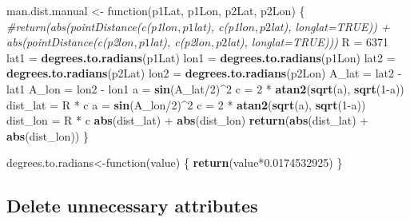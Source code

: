 \documentclass[]{article}
\newenvironment{Shaded}{\begin{snugshade}}{\end{snugshade}}
\newcommand{\KeywordTok}[1]{\textcolor[rgb]{0.13,0.29,0.53}{\textbf{{#1}}}}
\newcommand{\DecValTok}[1]{\textcolor[rgb]{0.00,0.00,0.81}{{#1}}}
\newcommand{\FloatTok}[1]{\textcolor[rgb]{0.00,0.00,0.81}{{#1}}}
\newcommand{\StringTok}[1]{\textcolor[rgb]{0.31,0.60,0.02}{{#1}}}
\newcommand{\CommentTok}[1]{\textcolor[rgb]{0.56,0.35,0.01}{\textit{{#1}}}}
\newcommand{\NormalTok}[1]{{#1}}
\begin{document}
\begin{Shaded}
\begin{Highlighting}[]
\NormalTok{man.dist.manual <-}\StringTok{ }\NormalTok{function(p1Lat, p1Lon, p2Lat, p2Lon) \{}
  \CommentTok{#return(abs(pointDistance(c(p1$lon, p1$lat), c(p1$lon, p2$lat), longlat=TRUE)) + abs(pointDistance(c(p2$lon, p1$lat), c(p2$lon, p2$lat), longlat=TRUE)))}
  \NormalTok{R =}\StringTok{ }\DecValTok{6371}
  \NormalTok{lat1 =}\StringTok{ }\KeywordTok{degrees.to.radians}\NormalTok{(p1Lat)}
  \NormalTok{lon1 =}\StringTok{ }\KeywordTok{degrees.to.radians}\NormalTok{(p1Lon)}
  \NormalTok{lat2 =}\StringTok{ }\KeywordTok{degrees.to.radians}\NormalTok{(p2Lat)}
  \NormalTok{lon2 =}\StringTok{ }\KeywordTok{degrees.to.radians}\NormalTok{(p2Lon)}
  \NormalTok{A_lat =}\StringTok{ }\NormalTok{lat2 -}\StringTok{ }\NormalTok{lat1}
  \NormalTok{A_lon =}\StringTok{ }\NormalTok{lon2 -}\StringTok{ }\NormalTok{lon1}
  \NormalTok{a =}\StringTok{ }\KeywordTok{sin}\NormalTok{(A_lat/}\DecValTok{2}\NormalTok{)^}\DecValTok{2}
  \NormalTok{c =}\StringTok{ }\DecValTok{2} \NormalTok{*}\StringTok{ }\KeywordTok{atan2}\NormalTok{(}\KeywordTok{sqrt}\NormalTok{(a), }\KeywordTok{sqrt}\NormalTok{(}\DecValTok{1}\NormalTok{-a))}
  \NormalTok{dist_lat =}\StringTok{ }\NormalTok{R *}\StringTok{ }\NormalTok{c}
  \NormalTok{a =}\StringTok{ }\KeywordTok{sin}\NormalTok{(A_lon/}\DecValTok{2}\NormalTok{)^}\DecValTok{2}
  \NormalTok{c =}\StringTok{ }\DecValTok{2} \NormalTok{*}\StringTok{ }\KeywordTok{atan2}\NormalTok{(}\KeywordTok{sqrt}\NormalTok{(a), }\KeywordTok{sqrt}\NormalTok{(}\DecValTok{1}\NormalTok{-a))}
  \NormalTok{dist_lon =}\StringTok{ }\NormalTok{R *}\StringTok{ }\NormalTok{c}
  \KeywordTok{abs}\NormalTok{(dist_lat) +}\StringTok{ }\KeywordTok{abs}\NormalTok{(dist_lon)}
  \KeywordTok{return}\NormalTok{(}\KeywordTok{abs}\NormalTok{(dist_lat) +}\StringTok{ }\KeywordTok{abs}\NormalTok{(dist_lon))}
\NormalTok{\}}

\NormalTok{degrees.to.radians<-function(value) \{}
  \KeywordTok{return}\NormalTok{(value*}\FloatTok{0.0174532925}\NormalTok{)}
\NormalTok{\}}
\end{Highlighting}
\end{Shaded}

\subsection{Delete unnecessary
attributes}\label{delete-unnecessary-attributes}

\begin{Shaded}
\end{Shaded}
\end{document}
